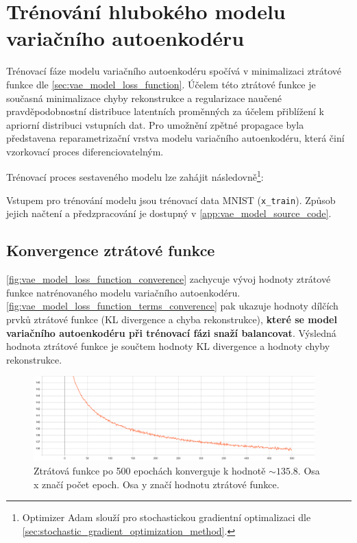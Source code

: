 \section{Trénování hlubokého modelu variačního autoenkodéru}
Trénovací fáze modelu variačního autoenkodéru spočívá v minimalizaci ztrátové funkce dle \autoref{sec:vae_model_loss_function}.
Účelem této ztrátové funkce je současná minimalizace chyby rekonstrukce a regularizace naučené pravděpodobnostní distribuce latentních proměnných za účelem přiblížení k apriorní distribuci vstupních dat.
Pro umožnění zpětné propagace byla představena reparametrizační vrstva modelu variačního autoenkodéru, která činí vzorkovací proces diferenciovatelným.

Trénovací proces sestaveného modelu lze zahájit následovně\footnote{Optimizer Adam slouží pro stochastickou gradientní optimalizaci dle \autoref{sec:stochastic_gradient_optimization_method}.}:


Vstupem pro trénování modelu jsou trénovací data MNIST (\lstinline{x_train}). Způsob jejich načtení a předzpracování je dostupný v \autoref{app:vae_model_source_code}.

\newpage
\subsection{Konvergence ztrátové funkce}
\autoref{fig:vae_model_loss_function_converence} zachycuje vývoj hodnoty ztrátové funkce natrénovaného modelu variačního autoenkodéru.
\autoref{fig:vae_model_loss_function_terms_converence} pak ukazuje hodnoty dílčích prvků ztrátové funkce (KL divergence a chyba rekonstrukce), \textbf{které se model variačního autoenkodéru při trénovací fázi snaží balancovat}.
Výsledná hodnota ztrátové funkce je součtem hodnoty KL divergence a hodnoty chyby rekonstrukce.

\begin{figure}[H]
    \centering
    \includegraphics[width=0.97\textwidth]{figures/vae_model_total_loss_500_epochs.pdf}
    \caption{Ztrátová funkce po 500 epochách konverguje k hodnotě $\sim 135.8$. Osa x značí počet epoch. Osa y značí hodnotu ztrátové funkce.}
    \label{fig:vae_model_loss_function_converence}
\end{figure}

